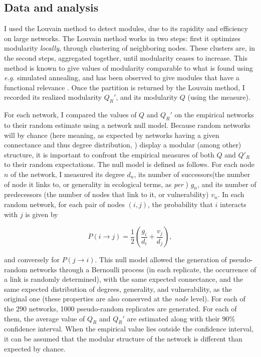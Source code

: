 \documentclass[12pt,oneside]{article}
\begin{document}
\subsection{Data and analysis}

I used the Louvain method \cite{blondel_fast_2008} to detect modules, due to
its rapidity and efficiency on large networks. The Louvain method works in two
steps: first it optimizes modularity \emph{locally}, through clustering of
neighboring nodes. These clusters are, in the second steps, aggregated
together, until modularity ceases to increase. This method is known to give
values of modularity comparable to what is found using \emph{e.g.} simulated
annealing, and has been observed to give modules that have a functional
relevance \cite{blondel_fast_2008}.  Once the partition is returned by the
Louvain method, I recorded its realized modularity $Q_R'$, and its modularity
$Q$ (using the \textcite{newman_finding_2004} measure).

For each network, I compared the values of $Q$ and $Q_R'$ on the empirical
networks to their random estimate using a network null model. Because random
networks will by chance (here meaning, as expected by networks having a
given connectance and thus degree distribution, \textcite{poisot_when_2013})
display a modular (among other) structure, it is important to confront the
empirical measures of both $Q$ and $Q'_R$ to their random expectations. The
null model is defined as follows. For each node $n$ of the network, I measured
its degree $d_n$, its number of successors(the number of node it links to,
or generality in ecological terms, as \emph{per} \cite{schoener_food_1989})
$g_n$, and its number of predecessors (the number of nodes that link to it,
or vulnerability) $v_n$. In each random network, for each pair of nodes
$(i,j)$, the probability that $i$ interacts with $j$ is given by

\begin{equation}
P(i\rightarrow j) = \frac{1}{2}\left(\frac{g_i}{d_i}+\frac{v_j}{d_j}\right),
\label{e:null}
\end{equation}

\noindent and conversely for $P(j \rightarrow i)$. This null model allowed
the generation of pseudo-random networks through a Bernoulli process (in
each replicate, the occurrence of a link is randomly determined), with the
same expected connectance, and the same expected distribution of degrees,
generality, and vulnerability, as the original one (these properties are
also conserved at the \emph{node} level).  For each of the 290 networks,
1000 pseudo-random replicates are generated. For each of them, the average
value of $Q_R$ and $Q_R'$ are estimated along with their 90\% confidence
interval. When the empirical value lies outside the confidence interval,
it can be assumed that the modular structure of the network is different
than expected by chance.
\end{document}
